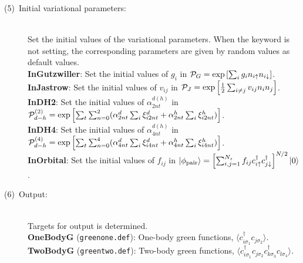 \begin{description}
\item[(5)~Initial variational parameters:]
~\\ Set the initial values of the variational parameters. When the keyword is not setting, the corresponding parameters are given by random values as default values.
~\\{\bf InGutzwiller}: Set the initial values of $g_i$ in ${\cal P}_G=\exp\left[ \sum_i g_i n_{i\uparrow} n_{i\downarrow} \right]$.
~\\{\bf InJastrow}: Set the initial values of $v_{ij}$ in ${\cal P}_J=\exp\left[\frac{1}{2} \sum_{i\neq j} v_{ij} n_i n_j\right]$.
~\\{\bf InDH2}:  Set the initial values of $\alpha_{2nt}^{d(h)}$ in ${\cal P}_{d-h}^{(2)}= \exp \left[ \sum_t \sum_{n=0}^2 (\alpha_{2nt}^d \sum_{i}\xi_{i2nt}^d+\alpha_{2nt}^h \sum_{i}\xi_{i2nt}^h)\right]$.
~\\{\bf InDH4}:  Set the initial values of $\alpha_{4nt}^{d(h)}$ in ${\cal P}_{d-h}^{(4)}= \exp \left[ \sum_t \sum_{n=0}^4 (\alpha_{4nt}^d \sum_{i}\xi_{i4nt}^d+\alpha_{4nt}^h \sum_{i}\xi_{i4nt}^h)\right]$.
~\\{\bf InOrbital}: Set the initial values of $ f_{ij}$ in $|\phi_{\rm pair} \rangle = \left[\sum_{i, j=1}^{N_s} f_{ij}c_{i\uparrow}^{\dag}c_{j\downarrow}^{\dag} \right]^{N/2}|0 \rangle$.

\item[(6)~Output:]
~\\
Targets for output is determined.
~\\{\bf OneBodyG }(\verb|greenone.def|): One-body green functions,
$\langle c^{\dagger}_{i\sigma_1}c_{j\sigma_2}\rangle$.
~\\{\bf TwoBodyG }(\verb|greentwo.def|): Two-body green functions,
$\langle c^{\dagger}_{i\sigma_1}c_{j\sigma_2}c^{\dagger}_{k \sigma_3}c_{l\sigma_4}\rangle$.
\end{description}
